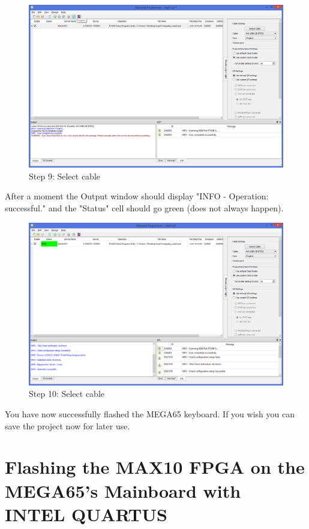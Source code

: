 \begin{figure}
  \includegraphics[width=\linewidth]{images/diamond09.png}
  \caption{Step 9: Select cable}
  \label{fig:diamond09}
\end{figure}

After a moment  the Output window should display "INFO - Operation: successful." and the "Status" cell should go green (does not always happen).

\begin{figure}
  \includegraphics[width=\linewidth]{images/diamond10.png}
  \caption{Step 10: Select cable}
  \label{fig:diamond10}
\end{figure}

You have now successfully flashed the MEGA65 keyboard. If you wish you can save the project now for later use.

\section{Flashing the MAX10 FPGA on the MEGA65's Mainboard with INTEL QUARTUS}
